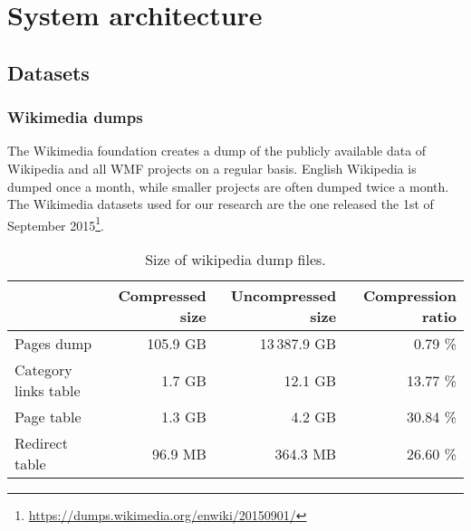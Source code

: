 
\chapter{System architecture}
\label{cha:system_architecture}

\section{Datasets}
\label{sec:datasets}

\subsection{Wikimedia dumps}
The Wikimedia foundation creates a dump of the publicly available data of Wikipedia and all WMF projects on a regular basis.
English Wikipedia is dumped once a month, while smaller projects are often dumped twice a month.
The Wikimedia datasets used for our research are the one released the 1st of September 2015\footnote{\url{https://dumps.wikimedia.org/enwiki/20150901/}}.

\begin{table}[]
\centering
\caption{Size of wikipedia dump files.}
\label{tbl:wikidumps_size}
\begin{tabular}{@{}lrrr@{}}
\multicolumn{1}{c}{\textbf{}} & \textbf{Compressed size} & \textbf{Uncompressed size} & \textbf{Compression ratio} \\ \midrule
Pages dump              &     105.9 GB &   13\,387.9 GB &  0.79 \% \\
Category links table    &       1.7 GB &        12.1 GB & 13.77 \% \\
Page table              &       1.3 GB &         4.2 GB & 30.84 \% \\
Redirect table          &      96.9 MB &       364.3 MB & 26.60 \%
\end{tabular}
\end{table}

